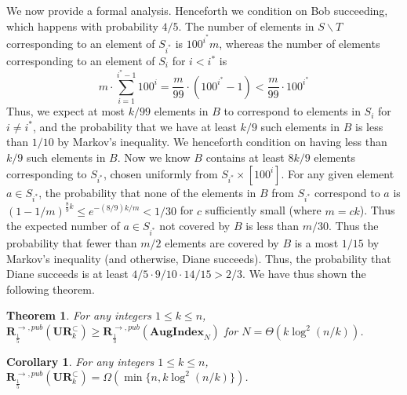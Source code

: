 \documentclass[11pt]{article}
\newtheorem{theorem}{Theorem}
\newtheorem{corollary}{Corollary}
\newcommand{\aug}{\mathbf{AugIndex}\xspace}
\newcommand{\ur}{\mathbf{UR}\xspace}
\newcommand{\randcom}{\mathbf{R}}
\begin{document}
We now provide a formal analysis. Henceforth we condition on Bob succeeding, which happens with probability $4/5$. The number of elements in $S\backslash T$ corresponding to an element of $S_{i^*}$ is $100^{i^*} m$, whereas the number of elements corresponding to an element of $S_i$ for $i < i^*$ is
$$
m\cdot \sum_{i=1}^{i^*-1} 100^i = \frac m{99}\cdot (100^{i^*} - 1) < \frac m{99}\cdot 100^{i^*}
$$
Thus, we expect at most $k/99$ elements in $B$ to correspond to elements in $S_i$ for $i\neq i^*$, and the probability that we have at least $k/9$ such elements in $B$ is less than $1/10$ by Markov's inequality. We henceforth condition on having less than $k/9$ such elements in $B$. Now we know $B$ contains at least $8k/9$ elements corresponding to $S_{i^*}$, chosen uniformly from $S_{i^*}\times [100^i]$. For any given element $a\in S_{i^*}$, the probability that none of the elements in $B$ from $S_{i^*}$ correspond to $a$ is $(1 - 1/m)^{\frac 89 k} \le e^{-(8/9)k/m} < 1/30$ for $c$ sufficiently small (where $m = ck$). Thus the expected number of $a\in S_{i^*}$ not covered by $B$ is less than $m/30$. Thus the probability that fewer than $m/2$ elements are covered by $B$ is a most $1/15$ by Markov's inequality (and otherwise, Diane succeeds). Thus, the probability that Diane succeeds is at least $4/5\cdot 9/10 \cdot 14/15 > 2/3$. We have thus shown the following theorem.

\begin{theorem}
For any integers $1\le k \le n$, $\randcom^{\rightarrow,pub}_{\frac 15}(\ur_k^\subset) \ge \randcom^{\rightarrow,pub}_{\frac 13}(\aug_N)$ for $N = \Theta(k\log^2(n/k))$.
\end{theorem}

\begin{corollary}
For any integers $1\le k \le n$, $\randcom^{\rightarrow,pub}_{\frac 15}(\ur_k^\subset) = \Omega(\min\{n, k\log^2(n/k)\})$.
\end{corollary}
\end{document}
